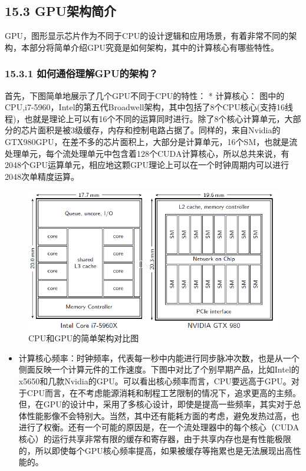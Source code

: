 \subsection{15.3 GPU架构简介}\label{gpuux67b6ux6784ux7b80ux4ecb}

GPU，图形显示芯片作为不同于CPU的设计逻辑和应用场景，有着非常不同的架构，本部分将简单介绍GPU究竟是如何架构，其中的计算核心有哪些特性。

\subsubsection{15.3.1
如何通俗理解GPU的架构？}\label{ux5982ux4f55ux901aux4fd7ux7406ux89e3gpuux7684ux67b6ux6784}

首先，下图简单地展示了几个GPU不同于CPU的特性： * 计算核心：
图中的CPU,i7-5960，Intel的第五代Broadwell架构，其中包括了8个CPU核心(支持16线程)，也就是理论上可以有16个不同的运算同时进行。除了8个核心计算单元，大部分的芯片面积是被3级缓存，内存和控制电路占据了。同样的，来自Nvidia的GTX980GPU，在差不多的芯片面积上，大部分是计算单元，16个SM，也就是流处理单元，每个流处理单元中包含着128个CUDA计算核心，所以总共来说，有2048个GPU运算单元，相应地这颗GPU理论上可以在一个时钟周期内可以进行2048次单精度运算。

\begin{figure}
\centering
\includegraphics{./img/ch15/cpu_gpu.png}
\caption{CPU和GPU的简单架构对比图}
\end{figure}

\begin{itemize}
\item
  计算核心频率：时钟频率，代表每一秒中内能进行同步脉冲次数，也是从一个侧面反映一个计算元件的工作速度。下图中对比了个别早期产品，比如Intel的x5650和几款Nvidia的GPU。可以看出核心频率而言，CPU要远高于GPU。对于CPU而言，在不考虑能源消耗和制程工艺限制的情况下，追求更高的主频。但，在GPU的设计中，采用了多核心设计，即使是提高一些频率，其实对于总体性能影像不会特别大。当然，其中还有能耗方面的考虑，避免发热过高，也进行了权衡。还有一个可能的原因是，在一个流处理器中的每个核心（CUDA核心）的运行共享非常有限的缓存和寄存器，由于共享内存也是有性能极限的，所以即使每个GPU核心频率提高，如果被缓存等拖累也是无法展现出高性能的。
\end{itemize}

